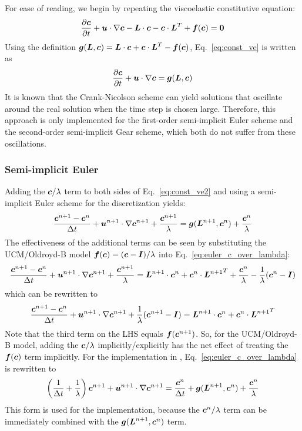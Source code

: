 For ease of reading, we begin by repeating the viscoelastic constitutive 
equation:
\begin{equation}
  \dfrac{\partial \boldsymbol{c}}{\partial t}
  +\boldsymbol{u}\cdot\nabla\boldsymbol{c}-\boldsymbol{L}\cdot\boldsymbol{c}-\boldsymbol{c}\cdot\boldsymbol{L}^T
   +\boldsymbol{f}(\boldsymbol{c})=\boldsymbol{0} \label{eq:const_ve}
\end{equation}
Using the definition $\boldsymbol{g}(\boldsymbol{L},\boldsymbol{c})=\boldsymbol{L}\cdot\boldsymbol{c}
+\boldsymbol{c}\cdot\boldsymbol{L}^T-\boldsymbol{f}(\boldsymbol{c})$, Eq.~\eqref{eq:const_ve} is written as
\begin{equation}
  \dfrac{\partial \boldsymbol{c}}{\partial t}
  +\boldsymbol{u}\cdot\nabla\boldsymbol{c}=\boldsymbol{g}(\boldsymbol{L},\boldsymbol{c}) \label{eq:const_ve2}
\end{equation}
It is known that the Crank-Nicolson scheme can yield solutions that
oscillate around the real solution when the time step is chosen large.
Therefore, this approach is only implemented for 
the first-order semi-implicit Euler scheme and the second-order
semi-implicit Gear scheme, which both do not suffer from these
oscillations.

\subsubsection{Semi-implicit Euler}
Adding the $\boldsymbol{c}/\lambda$ term to both sides of Eq.~\eqref{eq:const_ve2} 
and using a semi-implicit Euler scheme for the discretization yields:
\begin{equation}
  \frac{\boldsymbol{c}^{n+1}-\boldsymbol{c}^n}{\Delta t}+\boldsymbol{u}^{n+1}\cdot\nabla\boldsymbol{c}^{n+1}+
  \frac{\boldsymbol{c}^{n+1}}{\lambda}=
\boldsymbol{g}(\boldsymbol{L}^{n+1}, \boldsymbol{c}^n)+
  \frac{\boldsymbol{c}^{n}}{\lambda}
  \label{eq:euler_c_over_lambda}
\end{equation}
The effectiveness of the additional terms can be seen by substituting the 
UCM/Oldroyd-B model $\boldsymbol{f}(\boldsymbol{c})=(\boldsymbol{c} - \boldsymbol{I})/\lambda$ into
Eq.~\eqref{eq:euler_c_over_lambda}:
\begin{equation}
  \frac{\boldsymbol{c}^{n+1}-\boldsymbol{c}^n}{\Delta t}+\boldsymbol{u}^{n+1}\cdot\nabla\boldsymbol{c}^{n+1}+
  \frac{\boldsymbol{c}^{n+1}}{\lambda}=
\boldsymbol{L}^{n+1}\cdot\boldsymbol{c}^n + \boldsymbol{c}^n \cdot 
  {\boldsymbol{L}^{n+1}}^T +
\frac{\boldsymbol{c}^{n}}{\lambda}-\frac{1}{\lambda}(\boldsymbol{c}^n-\boldsymbol{I})
\end{equation}
which can be rewritten to
\begin{equation}
  \frac{\boldsymbol{c}^{n+1}-\boldsymbol{c}^n}{\Delta t}+\boldsymbol{u}^{n+1}\cdot\nabla\boldsymbol{c}^{n+1}+
  \frac{1}{\lambda}(\boldsymbol{c}^{n+1}-\boldsymbol{I})=
  \boldsymbol{L}^{n+1}\cdot\boldsymbol{c}^n + \boldsymbol{c}^n \cdot {\boldsymbol{L}^{n+1}}^T
\end{equation}
Note that the third term on the LHS equals $\boldsymbol{f}(\boldsymbol{c}^{n+1})$. So, for 
the UCM/Oldroyd-B model, 
adding the $\boldsymbol{c}/\lambda$ implicitly/explicitly has the net effect 
of treating the $\boldsymbol{f}(\boldsymbol{c})$ term implicitly. 
For the implementation in 
\tfem, Eq.~\eqref{eq:euler_c_over_lambda} is rewritten to
\begin{equation}
  \left(\frac{1}{\Delta t}+\frac{1}{\lambda}\right)\boldsymbol{c}^{n+1}+
  \boldsymbol{u}^{n+1}\cdot\nabla\boldsymbol{c}^{n+1}=
     \frac{\boldsymbol{c}^n}{\Delta t} +
     \boldsymbol{g}(\boldsymbol{L}^{n+1},\boldsymbol{c}^n) + \frac{\boldsymbol{c}^n}{\lambda}
  \label{eq:Eulerimp_add}
\end{equation}
This form is used for the implementation, because the $\boldsymbol{c}^n/\lambda$ term 
can be immediately combined with the $\boldsymbol{g}(\boldsymbol{L}^{n+1},\boldsymbol{c}^n)$ term.

